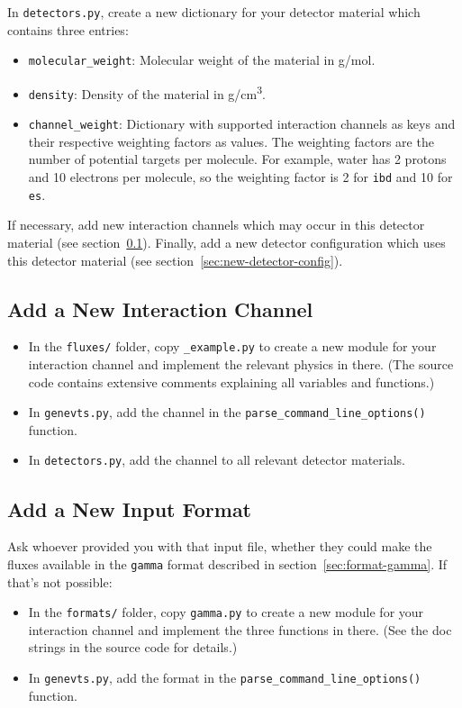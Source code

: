 \documentclass[11pt, oneside]{article}
\begin{document}
In \texttt{detectors.py}, create a new dictionary for your detector material which contains three entries:
\begin{itemize}
\item \texttt{molecular\_weight}: Molecular weight of the material in \si{g/mol}.
\item \texttt{density}: Density of the material in \si{g/cm^3}.
\item \texttt{channel\_weight}: Dictionary with supported interaction channels as keys and their respective weighting factors as values. The weighting factors are the number of potential targets per molecule. For example, water has 2 protons and 10 electrons per molecule, so the weighting factor is 2 for \texttt{ibd} and 10 for \texttt{es}.
\end{itemize}

If necessary, add new interaction channels which may occur in this detector material (see section~\ref{sec:new-interaction-channel}).
Finally, add a new detector configuration which uses this detector material (see section~\ref{sec:new-detector-config}).

\subsection{Add a New Interaction Channel}\label{sec:new-interaction-channel}

\begin{itemize}
\item In the \texttt{fluxes/} folder, copy \texttt{\_example.py} to create a new module for your interaction channel and implement the relevant physics in there.
(The source code contains extensive comments explaining all variables and functions.)
\item In \texttt{genevts.py}, add the channel in the \texttt{parse\_command\_line\_options()} function.
\item In \texttt{detectors.py}, add the channel to all relevant detector materials.
\end{itemize}


\subsection{Add a New Input Format}\label{sec:new-input-format}
Ask whoever provided you with that input file, whether they could make the fluxes available in the \texttt{gamma} format described in section~\ref{sec:format-gamma}.
If that’s not possible:
\begin{itemize}
\item In the \texttt{formats/} folder, copy \texttt{gamma.py} to create a new module for your interaction channel and implement the three functions in there.
(See the doc strings in the source code for details.)
\item In \texttt{genevts.py}, add the format in the \texttt{parse\_command\_line\_options()} function.
\end{itemize}


\clearpage
\footnotesize %


\end{document}
